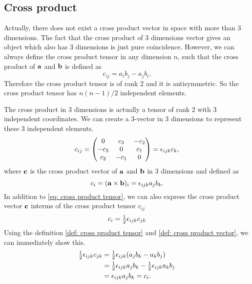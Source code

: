 \documentclass[10pt]{article}
\begin{document}
	\subsection{Cross product}

	Actually, there does not exist a cross product vector in space with more than 3 dimensions. The fact that the cross product of 3 dimensions vector gives an object which also has 3 dimensions is just pure coincidence. However, we can always define the cross product tensor in any dimension $n$, such that the cross product of ${\bf a}$ and ${\bf b}$ is defined as
	\begin{equation}
		c_{ij} = a_i b_j - a_j b_i. \label{def: cross product tensor}
	\end{equation}
	Therefore the cross product tensor is of rank 2 and it is antisymmetric. So the cross product tensor has $n(n-1)/2$ independent elements.

	The cross product in 3 dimensions is actually a tensor of rank 2 with 3 independent coordinates. We can create a 3-vector in 3 dimensions to represent these 3 independent elements.
	\begin{equation}
		c_{ij} =
		\begin{pmatrix}
			0 & c_3 & -c_2 \\
			-c_3 & 0 & c_1 \\
			c_2 & -c_1 & 0
		\end{pmatrix}
		= \epsilon_{ijk} c_k, \label{eq: cross product tensor}
	\end{equation}
	where ${\bf c}$ is the cross product vector of ${\bf a}$ and ${\bf b}$ in 3 dimensions and defined as
	\begin{equation}
		c_i = ({\bf a} \times {\bf b})_i = \epsilon_{ijk} a_j b_k. \label{def: cross product vector}
	\end{equation}
	In addition to \eqref{eq: cross product tensor}, we can also express the cross product vector ${\bf c}$ interms of the cross product tensor $c_{ij}$
	\begin{equation}
		c_i = \tfrac{1}{2} \epsilon_{ijk} c_{jk}
	\end{equation}
	Using the definition \eqref{def: cross product tensor} and \eqref{def: cross product vector}, we can immediately show this.
	\begin{align*}
		\tfrac{1}{2} \epsilon_{ijk} c_{jk}
		&= \tfrac{1}{2} \epsilon_{ijk} (a_j b_k - a_k b_j) \\
		&= \tfrac{1}{2} \epsilon_{ijk} a_j b_k - \tfrac{1}{2} \epsilon_{ijk} a_k b_j \\
		&= \epsilon_{ijk} a_j b_k = c_i.
	\end{align*}
\end{document}
